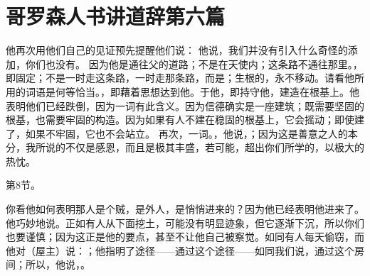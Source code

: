 
\section{哥罗森人书讲道辞第六篇}

\par

\par

他再次用他们自己的见证预先提醒他们说： 他说，我们并没有引入什么奇怪的添加，你们也没有。 因为他是通往父的道路；不是在天使内；这条路不通往那里。，即固定；不是一时走这条路，一时走那条路，而是；生根的，永不移动。请看他所用的词语是何等恰当。，即藉着思想达到他。于他，即持守他，建造在根基上。他表明他们已经跌倒，因为一词有此含义。因为信德确实是一座建筑；既需要坚固的根基，也需要牢固的构造。因为如果有人不建在稳固的根基上，它会摇动；即使建了，如果不牢固，它也不会站立。 再次，一词。，他说，；因为这是善意之人的本分，我所说的不仅是感恩，而且是极其丰盛，若可能，超出你们所学的，以极大的热忱。\par

第8节。 \par

你看他如何表明那人是个贼，是外人，是悄悄进来的？因为他已经表明他进来了。 他巧妙地说。正如有人从下面挖土，可能没有明显迹象，但它逐渐下沉，所以你们也要谨慎；因为这正是他的要点，甚至不让他自己被察觉。如同有人每天偷窃，而他对（屋主）说：；他指明了途径——通过这个途径——如同我们说，通过这个房间；所以，他说，。\par

